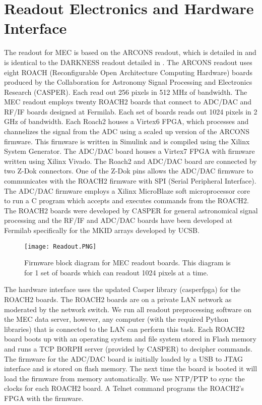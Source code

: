 \documentclass[../main.tex]{subfiles}
\begin{document}
\section{Readout Electronics and Hardware Interface}
\label{sec:readout_electronics}
The readout for MEC is based on the ARCONS readout, which is detailed in \textcite{McHugh_2012} and is identical to the DARKNESS readout detailed in \textcite{Strader_2016}. The ARCONS readout uses eight ROACH (Reconfigurable Open Architecture Computing Hardware) boards produced by the Collaboration for Astronomy Signal Processing and Electronics Research (CASPER). Each read out 256 pixels in 512 MHz of bandwidth. The MEC readout employs twenty ROACH2 boards that connect to ADC/DAC and RF/IF boards designed at Fermilab. Each set of boards reads out 1024 pixels in 2 GHz of bandwidth. Each Roach2 houses a Virtex6 FPGA, which processes and channelizes the signal from the ADC using a scaled up version of the ARCONS firmware. This firmware is written in Simulink and is compiled using the Xilinx System Generator. The ADC/DAC board houses a Virtex7 FPGA with firmware written using Xilinx Vivado. The Roach2 and ADC/DAC board are connected by two Z-Dok connectors. One of the Z-Dok pins allows the ADC/DAC firmware to communicates with the ROACH2 firmware with SPI (Serial Peripheral Interface). The ADC/DAC firmware employs a Xilinx MicroBlaze soft microprocessor core to run a C program which accepts and executes commands from the ROACH2. The ROACH2 boards were developed by CASPER for general astronomical signal processing and the RF/IF and ADC/DAC boards have been developed at Fermilab specifically for the MKID arrays developed by UCSB. 

\begin{figure}[!t] 
  \texttt{[image: Readout.PNG]}
  \caption[Firmware block diagram for MEC readout boards]{Firmware block diagram for MEC readout boards. This diagram is for 1 set of boards which can readout 1024 pixels at a time.}
  \label{fig:readout}
\end{figure}

The hardware interface uses the updated Casper library (casperfpga) for the ROACH2 boards. The ROACH2 boards are on a private LAN network as moderated by the network switch. We run all readout preprocessing software on the MEC data server, however, any computer (with the required Python libraries) that is connected to the LAN can perform this task. Each ROACH2 board boots up with an operating system and file system stored in Flash memory and runs a TCP BORPH server (provided by CASPER) to decipher commands. The firmware for the ADC/DAC board is initially loaded by a USB to JTAG interface and is stored on flash memory. The next time the board is booted it will load the firmware from memory automatically. We use NTP/PTP to sync the clocks for each ROACH2 board. A Telnet command programs the ROACH2's FPGA with the firmware.
\end{document}
